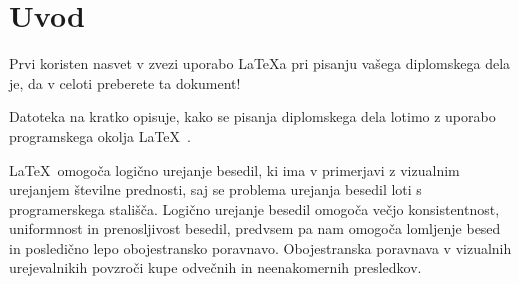 \documentclass[a4paper,12pt,openright]{book}
\begin{document}

\newcommand{\tpovzetek}
{V vzorcu je predstavljen postopek priprave diplomskega dela z uporabo okolja \LaTeX. Vaš povzetek mora sicer vsebovati med približno 100 in 200 besed, ta tukaj je odločno prekratek.
Dober povzetek je kot mini diploma in vključuje: (1) kratek opis stanja tehnike in kaj so glavne težave oz. opis obravnavanega problema, (2) kako ste ta problem naslovili oz. kratek opis vašega pristopa za reševanje tega problema in (3) (najbolj uspešen) rezultat ali prispevek diplomske naloge.}

\newcommand{\tabstract}
{This sample document presents the process of preparing a thesis using the \LaTeX\ environment. Your abstract should otherwise contain between approximately 100 and 200 words; the one provided here is far too short. A good abstract is like a mini-thesis and includes: (1) a brief description of the state of the art and the main issues or a description of the problem addressed, (2) how you addressed this problem or a brief description of your approach to solving it, and (3) the (most successful) result or contribution of the thesis.}



\mainmatter
\setcounter{page}{1}
\pagestyle{fancy}


\chapter{Uvod}
Prvi koristen nasvet v zvezi uporabo \LaTeX{a} pri pisanju vašega diplomskega dela je, da v celoti preberete ta dokument!

Datoteka na kratko opisuje, kako se pisanja diplomskega dela lotimo z uporabo programskega okolja \LaTeX~\cite{lamport,nenajkrajsi}.

\LaTeX\ omogoča logično urejanje besedil, ki ima v primerjavi z vizualnim urejanjem številne prednosti, saj se problema urejanja besedil loti s programerskega stališča.
Logično urejanje besedil omogoča večjo konsistentnost, uniformnost in prenosljivost besedil, predvsem pa nam omogoča lomljenje besed in posledično lepo obojestransko poravnavo. Obojestranska poravnava v vizualnih urejevalnikih povzroči kupe odvečnih in neenakomernih presledkov. 
\end{document}

